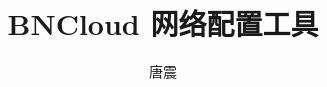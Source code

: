 \documentclass[a4paper,11pt,titlepage]{article}
\begin{document}
\setlength{\parindent}{2em}

\title{BNCloud 网络配置工具}
\author{唐震}
\maketitle

\tableofcontents
\listoffigures
\listoftables





\end{document}

